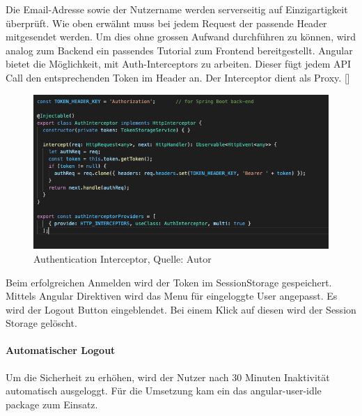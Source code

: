 Die Email-Adresse sowie der Nutzername werden serverseitig auf Einzigartigkeit überprüft. Wie oben erwähnt muss bei jedem Request der passende Header mitgesendet werden. Um dies ohne grossen Aufwand durchführen zu können, wird analog zum Backend ein passendes Tutorial zum Frontend bereitgestellt. Angular bietet die Möglichkeit, mit Auth-Interceptors zu arbeiten. Dieser fügt jedem API Call den entsprechenden Token im Header an. Der Interceptor dient als Proxy. [\cite{authAPIAngular}]

\begin{figure}[H]
	\centering
	\includegraphics[width=1\textwidth]{images/authInterceptor.PNG}
	\caption[Authentication Interceptor]{Authentication Interceptor, Quelle: Autor}
	\label{img: authInterceptor}
\end{figure} 
  
Beim erfolgreichen Anmelden wird der Token im \gls{SessionStorage} gespeichert.
Mittels Angular Direktiven wird das Menu für eingeloggte User angepasst. Es wird der Logout Button eingeblendet. Bei einem Klick auf diesen wird der Session Storage gelöscht. 
 
 \paragraph{Automatischer Logout}
 Um die Sicherheit zu erhöhen, wird der Nutzer nach 30 Minuten Inaktivität automatisch ausgeloggt. Für die Umsetzung kam ein das angular-user-idle package zum Einsatz. 
 
